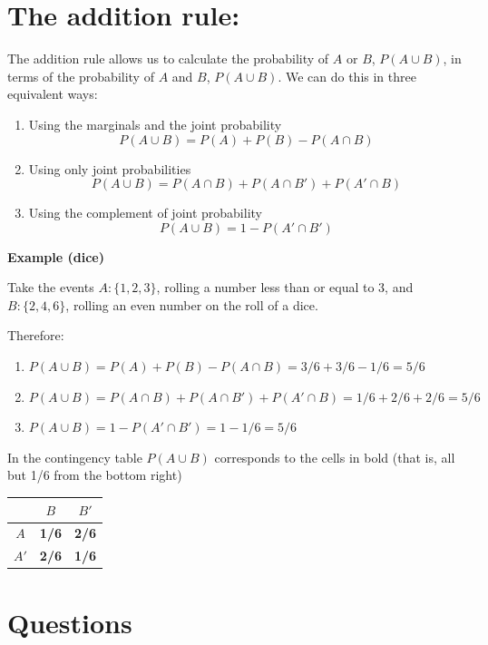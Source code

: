 \documentclass[
]{book}
\begin{document}
\hypertarget{the-addition-rule}{%
\section{The addition rule:}\label{the-addition-rule}}

The addition rule allows us to calculate the probability of \(A\) or \(B\), \(P( A \cup B)\), in terms of the probability of \(A\) and \(B\), \(P(A \cup B )\). We can do this in three equivalent ways:

\begin{enumerate}
\def\labelenumi{\arabic{enumi})}
\item
  Using the marginals and the joint probability
  \[P(A \cup B)=P(A) + P(B) - P(A\cap B)\]
\item
  Using only joint probabilities
  \[P( A \cup B)=P(A \cap B)+P(A\cap B')+P(A'\cap B)\]
\item
  Using the complement of joint probability
  \[P(A \cup B)=1-P(A'\cap B')\]
\end{enumerate}

\textbf{Example (dice)}

Take the events \(A:\{ 1,2,3\}\), rolling a number less than or equal to \(3\), and \(B:\{2,4,6\}\), rolling an even number on the roll of a dice.

Therefore:

\begin{enumerate}
\def\labelenumi{\arabic{enumi})}
\item
  \(P( A \cup B)=P(A) + P(B) - P(A\cap B)=3/6+3/6-1/6=5/6\)
\item
  \(P(A \cup B)=P(A \cap B)+P(A\cap B')+P(A'\cap B)=1/6+2/6+2/6=5/6\)
\item
  \(P(A \cup B)=1-P(A'\cap B')= 1-1/6=5/6\)
\end{enumerate}

In the contingency table \(P( A \cup B)\) corresponds to the cells in bold (that is, all but 1/6 from the bottom right)

\begin{longtable}[]{@{}ccc@{}}
\toprule
& \(B\) & \(B'\) \\
\midrule
\endhead
\(A\) & \textbf{1/6} & \textbf{2/6} \\
\(A'\) & \textbf{2/6} & \textbf{1/6} \\
\bottomrule
\end{longtable}

\hypertarget{questions-1}{%
\section{Questions}\label{questions-1}}
\end{document}
